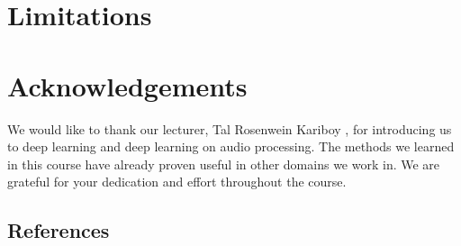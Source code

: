 \documentclass[11pt]{article}
\begin{document}
\section*{Limitations}

\section*{Acknowledgements}

We would like to thank our lecturer, Tal Rosenwein Kariboy
, for introducing us to deep learning and deep learning on audio processing. The methods we learned in this course have already proven useful in other domains we work in. We are grateful for your dedication and effort throughout the course.


\subsection{References}


\end{document}
